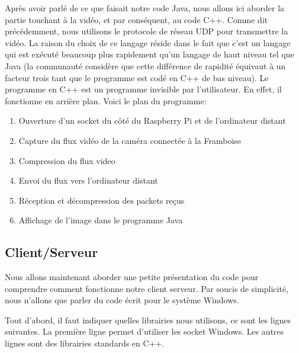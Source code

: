 \documentclass[a4paper,11pt]{report}
\begin{document}
{\begin{enumerate}
\begin{enumerate}
Après avoir parlé de ce que faisait notre code Java, nous allons ici aborder la partie touchant à la vidéo, et par conséquent, au code C++.  Comme dit précédemment, nous utilisons le protocole de réseau UDP  pour transmettre la vidéo. La raison du choix de ce langage réside dans le fait que c'est un langage qui est exécuté beaucoup plus rapidement qu'un langage de haut niveau tel que Java (la communauté considère que cette différence de rapidité équivaut à un facteur trois tant que le programme est codé en C++ de bas niveau). Le programme en C++ est un programme invisible par l'utilisateur. En effet, il fonctionne en arrière plan. Voici le plan du programme:
\begin{enumerate}
\item Ouverture d'un socket du côté du Raspberry Pi et de l'ordinateur distant
\item Capture du flux vidéo de la caméra connectée à la Framboise
\item Compression du flux video
\item Envoi du flux vers l'ordinateur distant
\item Réception et décompression des packets reçus
\item Affichage de l'image dans le programme Java
\end{enumerate}



\subsection{Client/Serveur}

Nous allons maintenant aborder une petite présentation du code pour comprendre comment fonctionne notre client serveur. Par soucis de simplicité, nous n'allons que parler du code écrit pour le système Windows. 

Tout d'abord, il faut indiquer quelles librairies nous utilisons, ce sont les lignes suivantes. La première ligne permet d'utiliser les socket Windows. Les autres lignes sont des librairies standards en C++.



\end{enumerate}
\end{enumerate}}
\end{document}
